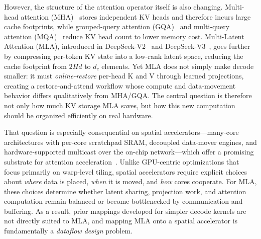 \documentclass[sigconf, review, anonymous]{acmart}
\begin{document}
However, the structure of the attention operator itself is also
changing.  Multi-head attention (MHA)~\cite{vaswani2017attention}
stores independent KV heads and therefore incurs large cache
footprints, while grouped-query attention (GQA)~\cite{ainslie2023gqa}
and multi-query attention (MQA)~\cite{shazeer2019mqa} reduce KV head
count to lower memory cost.  Multi-Latent Attention (MLA), introduced
in DeepSeek-V2~\cite{deepseekai2024deepseekv2} and
DeepSeek-V3~\cite{deepseekai2024deepseekv3}, goes further by
compressing per-token KV state into a low-rank latent space, reducing
the cache footprint from $2Hd$ to $d_c$ elements.  Yet MLA does not
simply make decode smaller: it must \emph{online-restore} per-head K
and V through learned projections, creating a restore-and-attend
workflow whose compute and data-movement behavior differs qualitatively
from MHA/GQA.  The central question is therefore not only how much KV
storage MLA saves, but how this new computation should be organized
efficiently on real hardware.

That question is especially consequential on spatial
accelerators---many-core architectures with per-core scratchpad SRAM,
decoupled data-mover engines, and hardware-supported multicast over the
on-chip network---which offer a promising substrate for attention
acceleration~\cite{tenstorrent2024wormhole, tandem2023,
dynamic-alloc2024}.  Unlike GPU-centric optimizations that focus
primarily on warp-level tiling, spatial accelerators require explicit
choices about \emph{where} data is placed, \emph{when} it is moved, and
\emph{how} cores cooperate.  For MLA, these choices determine whether
latent sharing, projection work, and attention computation remain
balanced or become bottlenecked by communication and buffering.  As a
result, prior mappings developed for simpler decode kernels are not
directly suited to MLA, and mapping MLA onto a spatial accelerator is
fundamentally a \emph{dataflow design} problem.
\end{document}
